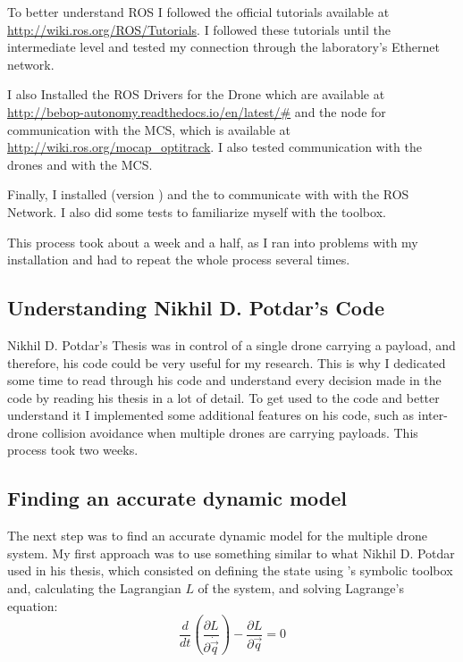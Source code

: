 To better understand \ac{ROS} I followed the official tutorials available at \url{http://wiki.ros.org/ROS/Tutorials}. I followed these tutorials until the intermediate level and tested my connection through the laboratory's Ethernet network.

I also Installed the ROS Drivers for the Drone which are available at \url{http://bebop-autonomy.readthedocs.io/en/latest/#} and the node for communication with the \ac{MCS}, which is available at \url{http://wiki.ros.org/mocap_optitrack}. I also tested communication with the drones and with the \ac{MCS}.

Finally, I installed  (version ) and the  to communicate with  with the \ac{ROS} Network. I also did some tests to familiarize myself with the toolbox.

This process took about a week and a half, as I ran into problems with my  installation and had to repeat the whole process several times.

\subsection{Understanding Nikhil D. Potdar's Code}
Nikhil D. Potdar's Thesis was in control of a single drone carrying a payload, and therefore, his code could be very useful for my research. This is why I dedicated some time to read through his code and understand every decision made in the code by reading his thesis \cite{Potdar2018} in a lot of detail. To get used to the code and better understand it I implemented some additional features on his code, such as inter-drone collision avoidance when multiple drones are carrying payloads. This process took two weeks.

\subsection{Finding an accurate dynamic model}
The next step was to find an accurate dynamic model for the multiple drone system. My first approach was to use something similar to what Nikhil D. Potdar used in his thesis, which consisted on defining the state using 's symbolic toolbox and, calculating the Lagrangian $L$ of the system, and solving Lagrange's equation:
\begin{equation*}
\frac{d}{dt}
\left(
\frac{\partial L}{\partial \dot{\vec q}}
\right) - 
\frac{\partial L}{\partial \vec q}
= 0
\end{equation*}

